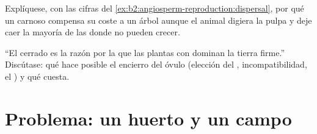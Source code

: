 \begin{exercise}[$\star\star\star$]\label{exo:b2:angiosperm-reproduction:11}
Explíquese, con las cifras del \cref{ex:b2:angiosperm-reproduction:dispersal},
por qué un  carnoso compensa su coste a un árbol aunque el animal
digiera la pulpa y deje caer la mayoría de las  donde no pueden
crecer.
\end{exercise}

\begin{exercise}[$\star\star\star$]\label{exo:b2:angiosperm-reproduction:12}
``El  cerrado es la razón por la que las plantas con 
dominan la tierra firme.'' Discútase: qué hace posible el encierro del
óvulo (elección del , incompatibilidad, el ) y qué cuesta.
\end{exercise}

\section{Problema: un huerto y un campo}

